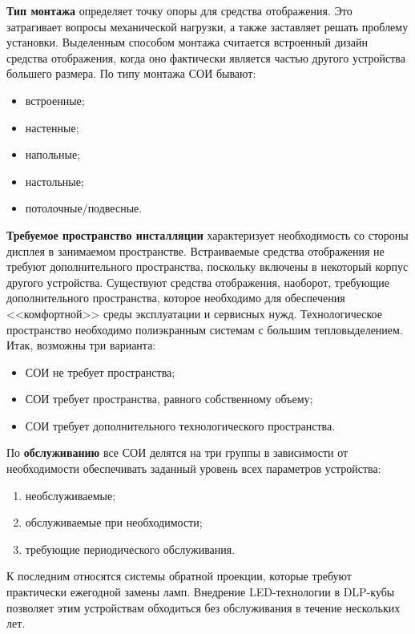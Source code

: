 \begin{multicols}{2}
   \textbf{Тип монтажа} определяет точку опоры для средства отображения. 
Это затрагивает вопросы механической нагрузки, а также заставляет решать 
проб\-ле\-му установки. Выделенным способом монтажа считается встроенный 
дизайн средства отоб\-ра\-же\-ния, когда оно фактически является частью другого 
устройства большего размера. По типу монтажа СОИ бывают:
   \begin{itemize}
\item встроенные;
\item настенные;
\item напольные;
\item настольные;
\item потолочные/подвесные.
\end{itemize}

   \textbf{Требуемое пространство инсталляции} характеризует 
необходимость со стороны дисплея в за\-ни\-ма\-емом пространстве. 
Встраиваемые средства отображения не требуют дополнительного 
пространства, поскольку включены в некоторый корпус другого устройства. 
Существуют средства отображения, наоборот, требующие дополнительного 
пространства, которое необходимо для обеспечения <<комфортной>> среды 
эксплуатации и сервисных нужд. Технологическое пространство 
необходимо полиэкранным системам с большим тепловыделением. Итак, 
возможны три варианта:
   \begin{itemize}
\item СОИ не требует пространства;
\item СОИ требует пространства, равного собственному объему;
\item СОИ требует дополнительного технологического пространства.
\end{itemize}

   По \textbf{обслуживанию} все СОИ делятся на три группы в зависимости 
от необходимости обеспечивать заданный уровень всех параметров 
устройства:
   \begin{enumerate}[(1)]
\item необслуживаемые;
\item обслуживаемые при необходимости;
\item требующие периодического обслуживания.
\end{enumerate}

     К последним относятся системы обратной проекции, которые требуют 
практически ежегодной замены ламп. Внедрение LED-тех\-но\-ло\-гии в 
     DLP-ку\-бы позволяет этим устройствам обходиться без обслуживания в 
течение нескольких лет. 


\end{multicols}
